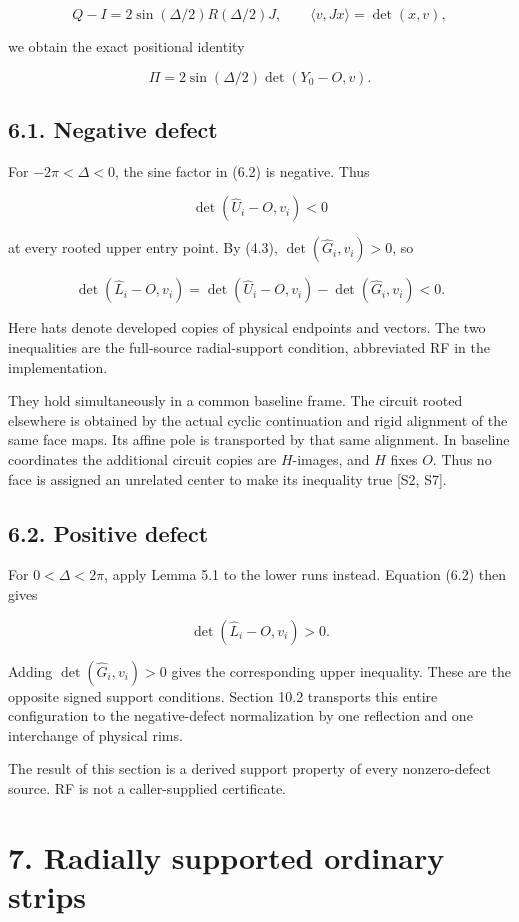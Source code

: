 \documentclass[
  11pt,
  letterpaper,
]{article}
\begin{document}
\[
Q-I=2\sin(\Delta/2)R(\Delta/2)J,
\qquad \langle v,Jx\rangle=\det(x,v),
\]

we obtain the exact positional identity

\[
\Pi=2\sin(\Delta/2)\det(Y_0-O,v).
\tag{6.2}
\]

\subsection{6.1. Negative defect}\label{negative-defect}

For \(-2\pi<\Delta<0\), the sine factor in (6.2) is negative. Thus

\[
\det(\widehat U_i-O,v_i)<0
\]

at every rooted upper entry point. By (4.3),
\(\det(\widehat G_i,v_i)>0\), so

\[
\det(\widehat L_i-O,v_i)
=\det(\widehat U_i-O,v_i)-\det(\widehat G_i,v_i)<0.
\tag{6.3}
\]

Here hats denote developed copies of physical endpoints and vectors. The
two inequalities are the full-source radial-support condition,
abbreviated RF in the implementation.

They hold simultaneously in a common baseline frame. The circuit rooted
elsewhere is obtained by the actual cyclic continuation and rigid
alignment of the same face maps. Its affine pole is transported by that
same alignment. In baseline coordinates the additional circuit copies
are \(H\)-images, and \(H\) fixes \(O\). Thus no face is assigned an
unrelated center to make its inequality true {[}S2, S7{]}.

\subsection{6.2. Positive defect}\label{positive-defect}

For \(0<\Delta<2\pi\), apply Lemma 5.1 to the lower runs instead.
Equation (6.2) then gives

\[
\det(\widehat L_i-O,v_i)>0.
\]

Adding \(\det(\widehat G_i,v_i)>0\) gives the corresponding upper
inequality. These are the opposite signed support conditions. Section
10.2 transports this entire configuration to the negative-defect
normalization by one reflection and one interchange of physical rims.

The result of this section is a derived support property of every
nonzero-defect source. RF is not a caller-supplied certificate.

\section{7. Radially supported ordinary
strips}\label{radially-supported-ordinary-strips}
\end{document}
